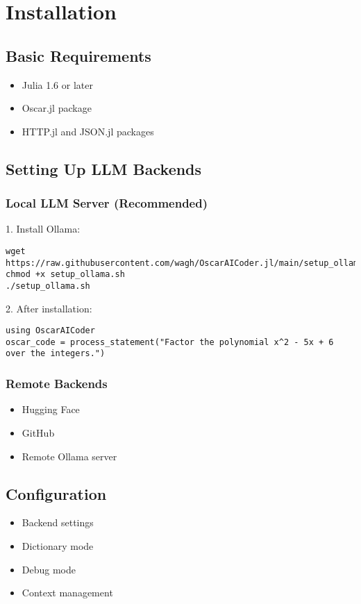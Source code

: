 \documentclass[11pt,a4paper]{article}
\begin{document}
\section{Installation}
\label{sec:installation_details}

\subsection{Basic Requirements}
\begin{itemize}
    \item Julia 1.6 or later
    \item Oscar.jl package
    \item HTTP.jl and JSON.jl packages
\end{itemize}

\subsection{Setting Up LLM Backends}

\subsubsection{Local LLM Server (Recommended)}
1. Install Ollama:
\begin{lstlisting}
wget https://raw.githubusercontent.com/wagh/OscarAICoder.jl/main/setup_ollama.sh
chmod +x setup_ollama.sh
./setup_ollama.sh
\end{lstlisting}

2. After installation:
\begin{lstlisting}
using OscarAICoder
oscar_code = process_statement("Factor the polynomial x^2 - 5x + 6 over the integers.")
\end{lstlisting}

\subsubsection{Remote Backends}
\begin{itemize}
    \item Hugging Face
    \item GitHub
    \item Remote Ollama server
\end{itemize}

\subsection{Configuration}
\begin{itemize}
    \item Backend settings
    \item Dictionary mode
    \item Debug mode
    \item Context management
\end{itemize}
\end{document}

